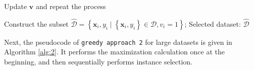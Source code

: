 \begin{algorithm}[H]
\begin{algorithmic}[1]
          \State Update $\boldsymbol{v}$ and repeat the process
      \EndWhile

      \State Construct the subset $\hat{\mathcal{D}}=\left\{\bm x_{i}, y_i \mid \left\{\bm x_{i}, y_i\right\} \in \mathcal{D}, v_i=1\right\}$;
      \Ensure Selected dataset: $\hat{\mathcal{D}}$

  \end{algorithmic}
\end{algorithm}

Next, the pseudocode of {\tt greedy approach 2} for large datasets is given in Algorithm \ref{alg:2}.
%
It performs the maximization calculation once at the beginning, and then sequentially performs instance selection.
%
\newpage

